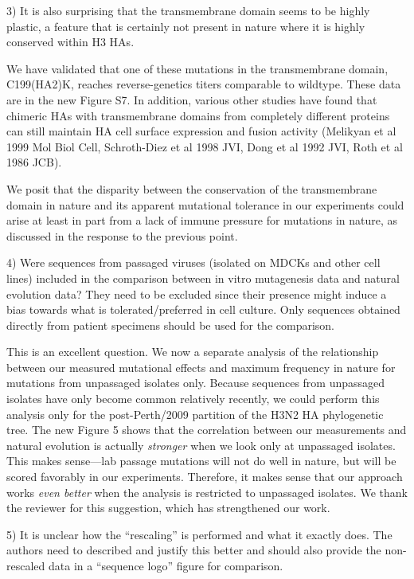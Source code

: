 \documentclass[11pt, oneside]{article}   	%
\newcommand{\response}[1]{{\color{black}#1}}
\begin{document}
3) It is also surprising that the transmembrane domain seems to be highly plastic, a feature that is certainly not present in nature where it is highly conserved within H3 HAs. 

\response{We have validated that one of these mutations in the transmembrane domain, C199(HA2)K, reaches reverse-genetics titers comparable to wildtype.
These data are in the new Figure S7.
In addition, various other studies have found that chimeric HAs with transmembrane domains from completely different proteins can still maintain HA cell surface expression and fusion activity (Melikyan et al 1999 Mol Biol Cell, Schroth-Diez et al 1998 JVI, Dong et al 1992 JVI, Roth et al 1986 JCB).

We posit that the disparity between the conservation of the transmembrane domain in nature and its apparent mutational tolerance in our experiments could arise at least in part from a lack of immune pressure for mutations in nature, as discussed in the response to the previous point.
}

4) Were sequences from passaged viruses (isolated on MDCKs and other cell lines) included in the comparison between in vitro mutagenesis data and natural evolution data? They need to be excluded since their presence might induce a bias towards what is tolerated/preferred in cell culture. Only sequences obtained directly from patient specimens should be used for the comparison. 

\response{
This is an excellent question.
We now a separate analysis of the relationship between our measured mutational effects and maximum frequency in nature for mutations from unpassaged isolates only.
Because sequences from unpassaged isolates have only become common relatively recently, we could perform this analysis only for the post-Perth/2009 partition of the H3N2 HA phylogenetic tree.
The new Figure 5 shows that the correlation between our measurements and natural evolution is actually \emph{stronger} when we look only at unpassaged isolates.
This makes sense---lab passage mutations will not do well in nature, but will be scored favorably in our experiments.
Therefore, it makes sense that our approach works \emph{even better} when the analysis is restricted to unpassaged isolates.
We thank the reviewer for this suggestion, which has strengthened our work.
}

5) It is unclear how the ``rescaling'' is performed and what it exactly does. The authors need to described and justify this better and should also provide the non-rescaled data in a ``sequence logo'' figure for comparison. 
\end{document}
